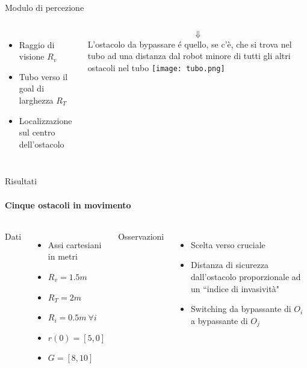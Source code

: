 \documentclass[handout]{beamer}
\begin{document}
\begin{frame}{Modulo di percezione}
\begin{columns}
	\centering
	\begin{itemize}
	\item Raggio di visione $R_v$
	\item Tubo verso il goal di larghezza $R_T$
	\item Localizzazione sul centro dell'ostacolo
	\end{itemize}
	\[\Downarrow\]
L'ostacolo da bypassare é quello, se c'è, che si trova nel tubo ad una distanza dal robot minore di tutti gli altri ostacoli nel tubo
	\centering
	\texttt{[image: tubo.png]}
\end{columns}
\end{frame}

\begin{frame}{Risultati}
\framesubtitle{Cinque ostacoli in movimento}
\centering
\graphicspath{ {../simulazioni/cinqueostacoli} }
\begin{columns}
Dati
\begin{itemize}
\item Assi cartesiani in metri
\item $R_v = 1.5m$
\item $R_T = 2m$
\item $R_i = 0.5m \ \forall i$
\item $r(0) = [5,0]$
\item $G = [8,10]$
\end{itemize}
Osservazioni
\begin{itemize}
\item Scelta verso cruciale
\item Distanza di sicurezza dall'ostacolo proporzionale ad un ``indice di invasività"
\item Switching da bypassante di $O_i$ a bypassante di $O_j$
\end{itemize}
\end{columns}
\end{frame}
\end{document}

